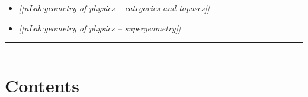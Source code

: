 \documentclass[12pt,titlepage]{article}
\theoremstyle{plain}
\theoremstyle{definition}
\theoremstyle{remark}
\begin{document}
\begin{itemize}%
\item \emph{[[nLab:geometry of physics -- categories and toposes]]}


\item \emph{[[nLab:geometry of physics -- supergeometry]]}



\end{itemize}

\vspace{.5em} \hrule \vspace{.5em}
$\,$

\hypertarget{contents}{}\section*{{Contents}}\label{contents}
\end{document}
